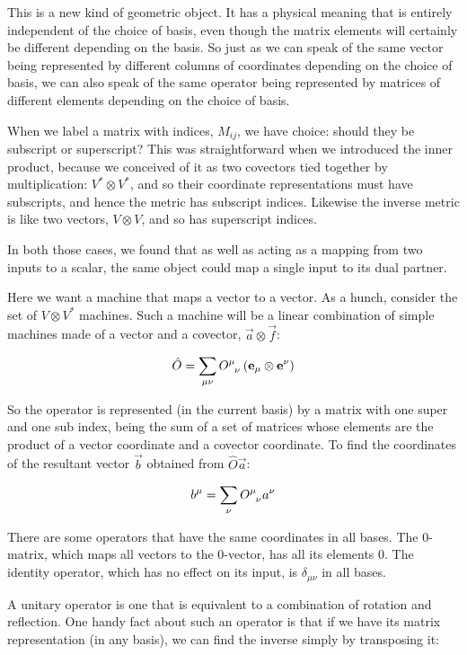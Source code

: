 This is a new kind of geometric object. It has a physical meaning that is entirely independent of the choice of basis, even though the matrix elements will certainly be different depending on the basis. So just as we can speak of the same vector being represented by different columns of coordinates depending on the choice of basis, we can also speak of the same operator being represented by matrices of different elements depending on the choice of basis.

When we label a matrix with indices, $M_{ij}$, we have choice: should they be subscript or superscript? This was straightforward when we introduced the inner product, because we conceived of it as two covectors tied together by multiplication: $V^* \otimes V^*$, and so their coordinate representations must have subscripts, and hence the metric has subscript indices. Likewise the inverse metric is like two vectors, $V \otimes V$, and so has superscript indices.

In both those cases, we found that as well as acting as a mapping from two inputs to a scalar, the same object could map a single input to its dual partner.

Here we want a machine that maps a vector to a vector. As a hunch, consider the set of $V \otimes V^*$ machines. Such a machine will be a linear combination of simple machines made of a vector and a covector, $\vec{a} \otimes \vec{f}$:

\begin{equation}
\hat{O} = \sum_{\mu\nu} O\indices{^\mu_\nu} \left( \vec{e}_\mu \otimes \vec{e}^\nu \right)
\end{equation}

So the operator is represented (in the current basis) by a matrix with one super and one sub index, being the sum of a set of matrices whose elements are the product of a vector coordinate and a covector coordinate. To find the coordinates of the resultant vector $\vec{b}$ obtained from $\hat{O} \vec{a}$:

$$
b^\mu = \sum_{\nu} O\indices{^\mu_\nu} a^\nu
$$

There are some operators that have the same coordinates in all bases. The $0$-matrix, which maps all vectors to the $0$-vector, has all its elements $0$. The identity operator, which has no effect on its input, is $\delta_{\mu\nu}$ in all bases.

A unitary operator is one that is equivalent to a combination of rotation and reflection. One handy fact about such an operator is that if we have its matrix representation (in any basis), we can find the inverse simply by transposing it:

